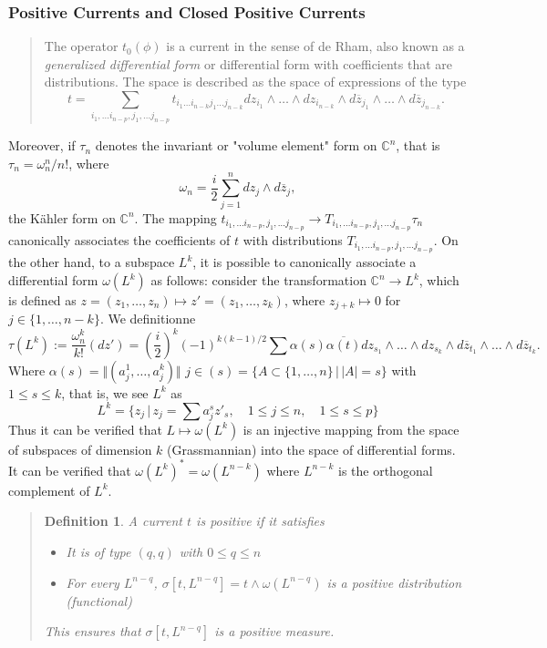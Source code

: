 \documentclass[12pt,twoside,a4paper]{report}
\newtheorem{definition}{Definition}[section]
\begin{document}
\subsubsection{Positive Currents and Closed Positive Currents}
\label{sec:org61c3412}
\begin{quote}
The operator $t_0(\phi)$ is a current in the sense of de Rham, also known as a \emph{generalized differential form} or differential form with coefficients that are distributions. The space is described as the space of expressions of the type
\[
    t=\sum_{i_1,\dots i_{n-p},j_1,\dots j_{n-p}}t_{i_1\dots i_{n-k}j_1\dots j_{n-k}} dz_{i_1}\wedge\dots\wedge dz_{i_{n-k}}\wedge d\overline{z}_{j_1}\wedge\dots\wedge d\overline{z}_{j_{n-k}}.
\]
\end{quote}
Moreover, if $\tau_n$ denotes the invariant or "volume element" form on $\mathbb{C}^n$, that is $\tau_n=\omega_n^n/n!$, where
\[
    \omega_n=\frac{i}{2}\sum_{j=1}^n dz_j\wedge d\overline{z}_j,
\]
the Kähler form on $\mathbb{C}^n$. The mapping $t_{i_1,\dots i_{n-p},j_1,\dots j_{n-p}}\rightarrow T_{i_1,\dots i_{n-p},j_1,\dots j_{n-p}}\tau_n$ canonically associates the coefficients of $t$ with distributions $T_{i_1,\dots i_{n-p},j_1,\dots j_{n-p}}$. On the other hand, to a subspace $L^k$,
\noindent it is possible to canonically associate a differential form $\omega(L^k)$ as follows: consider the transformation $\mathbb{C}^n\rightarrow L^k$, which is defined as $z=(z_1,\dots,z_n)\mapsto z'=(z_1,\dots,z_k)$, where $z_{j+k}\mapsto 0$ for $j\in\{1,\dots,n-k\}$. We definitionne
\[
    \tau(L^k):=\frac{\omega_n^k}{k!}(dz')=(\frac{i}{2})^k(-1)^{k(k-1)/2}\sum \alpha(s)\overline{\alpha(t)}dz_{s_1}\wedge\dots\wedge dz_{s_k}\wedge d\overline{z}_{t_1}\wedge \dots\wedge d\overline{z}_{t_k}.
\]
Where $\alpha(s)=\Vert(a^{1}_{j},\dots,a^{k}_{j})\Vert$ $j\in(s)=\{A\subset\{1,\dots,n\}\,\vert\, |A|=s\}$ with $1\leq s\leq k$, that is, we see $L^k$ as
\[
    L^k=\{z_j\,\vert\,z_j=\sum a^{s}_{j}z'_s,\quad 1\leq j\leq n,\quad 1\leq s\leq p \}
\]
Thus it can be verified that $L\mapsto\omega(L^k)$ is an injective mapping from the space of subspaces of dimension $k$ (Grassmannian) into the space of differential forms. It can be verified that $\omega(L^k)^{*}=\omega(L^{n-k})$ where $L^{n-k}$ is the orthogonal complement of $L^k$.
\begin{quote}
\begin{definition}
    A current $t$ is positive if it satisfies
    \begin{itemize}
        \item[a)] It is of type $(q,q)$ with $0\leq q\leq n$
        \item[b)] For every $L^{n-q}$, $\sigma[t,L^{n-q}]=t\wedge\omega(L^{n-q})$ is a positive distribution (functional)
    \end{itemize}
    This ensures that $\sigma[t,L^{n-q}]$ is a positive measure.
\end{definition}
\end{quote}
\end{document}

